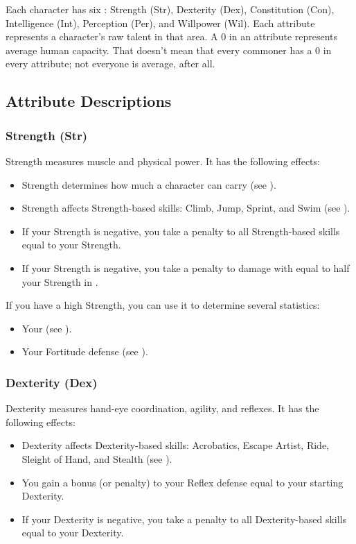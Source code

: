     Each character has six : Strength (Str), Dexterity (Dex), Constitution (Con), Intelligence (Int), Perception (Per), and Willpower (Wil).
    Each attribute represents a character's raw talent in that area.
    A 0 in an attribute represents average human capacity.
    That doesn't mean that every commoner has a 0 in every attribute; not everyone is average, after all.

    \subsection{Attribute Descriptions}

        \subsubsection{Strength (Str)}\label{Strength}
            Strength measures muscle and physical power.
            It has the following effects:
            \begin{itemize}
                \item Strength determines how much a character can carry (see ).
                \item Strength affects Strength-based skills: Climb, Jump, Sprint, and Swim (see ).
                \item If your Strength is negative, you take a penalty to all Strength-based skills equal to your Strength.
                \item If your Strength is negative, you take a penalty to damage with  equal to half your Strength in .
            \end{itemize}

            If you have a high Strength, you can use it to determine several statistics:
            \begin{itemize}
                \item Your  (see ).
                \item Your Fortitude defense (see ).
            \end{itemize}

        \subsubsection{Dexterity (Dex)}\label{Dexterity}
            Dexterity measures hand-eye coordination, agility, and reflexes.
            It has the following effects:
            \begin{itemize}
                \item Dexterity affects Dexterity-based skills: Acrobatics, Escape Artist, Ride, Sleight of Hand, and Stealth (see ).
                \item You gain a bonus (or penalty) to your Reflex defense equal to your starting Dexterity.
                \item If your Dexterity is negative, you take a penalty to all Dexterity-based skills equal to your Dexterity.
            \end{itemize}

